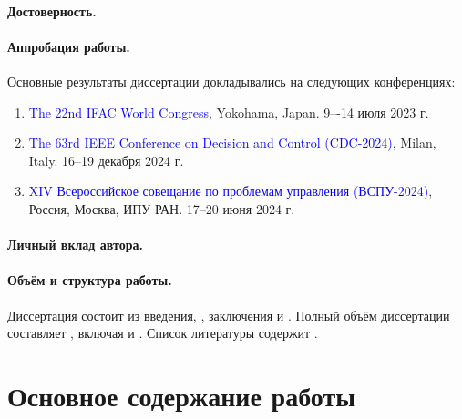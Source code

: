 \paragraph*{Достоверность.}
\paragraph*{Аппробация работы.}
Основные результаты диссертации докладывались на следующих конференциях:
\begin{enumerate}
	\item \textcolor{blue}{The 22nd IFAC World Congress}, Yokohama, Japan.  9–-14 июля 2023 г.
	\item \textcolor{blue}{The 63rd IEEE Conference on Decision and Control (CDC-2024)}, Milan, Italy. 16--19 декабря 2024 г.
	\item \textcolor{blue}{XIV Всероссийское совещание по проблемам управления (ВСПУ-2024)}, Россия, Москва, ИПУ РАН. 17--20 июня 2024 г.
\end{enumerate}
\paragraph*{Личный вклад автора.}


\paragraph*{Объём и структура работы.}
Диссертация состоит из введения,
,
заключения и
.
%
Полный объём диссертации составляет
, включая
 и
.
Список литературы содержит
.


\newpage
\section*{Основное содержание работы}

